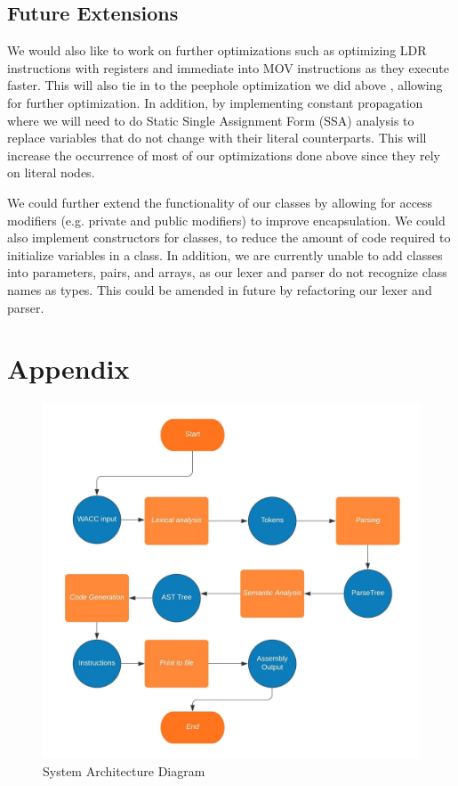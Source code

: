 \documentclass[11pt,a4paper]{article}
\begin{document}
\subsection{Future Extensions}
We would also like to work on further optimizations such as optimizing LDR instructions with registers and immediate into MOV instructions as they execute faster. This will also tie in to the peephole optimization we did above , allowing for further optimization. In addition, by implementing constant propagation where we will need to do Static Single Assignment Form (SSA) analysis to replace variables that do not change with their literal counterparts. This will increase the occurrence of most of our optimizations done above since they rely on literal nodes.


We could further extend the functionality of our classes by allowing for access modifiers (e.g. private and public modifiers) to improve encapsulation. We could also implement constructors for classes, to reduce the amount of code required to initialize variables in a class. In addition, we are currently unable to add classes into parameters, pairs, and arrays, as our lexer and parser do not recognize class names as types. This could be amended in future by refactoring our lexer and parser. 
\newpage
\section{Appendix}

\begin{figure}[!htb]
    \label{sec:figure1}
  \includegraphics[width=\textwidth]{system.jpeg}
  \caption{System Architecture Diagram}
\end{figure}
\end{document}
